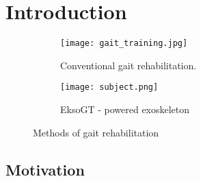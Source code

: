 \chapter{Introduction}

\begin{figure}
	\centering
	\begin{subfigure}{0.45\textwidth}
		\centering
		\texttt{[image: gait\_training.jpg]} %
		\caption{Conventional gait rehabilitation. \cite{gaitrehabgantry}}\label{fig:gantry}
	\end{subfigure}\hfill
	\begin{subfigure}{0.45\textwidth}
		\centering
		\texttt{[image: subject.png]}
		\caption{EksoGT - powered exoskeleton}\label{fig:subject}
	\end{subfigure}
	\caption{Methods of gait rehabilitation}
\end{figure}

\section{Motivation}
%

